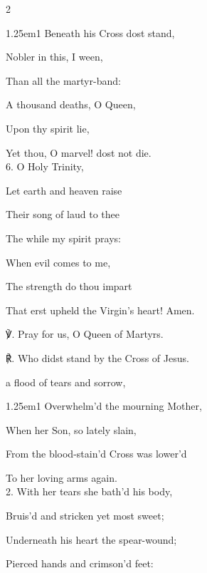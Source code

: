 \begin{paracol}{2}
\begin{hangparas}{1.25em}{1}
Beneath his Cross dost stand,

Nobler in this, I ween,

Than all the martyr-band:

A thousand deaths, O Queen,

Upon thy spirit lie,

Yet thou, O marvel! dost not die.\\

6. O Holy Trinity,

Let earth and heaven raise

Their song of laud to thee

The while my spirit prays:

When evil comes to me,

The strength do thou impart

That erst upheld the Virgin’s heart! Amen.\\
\end{hangparas}

℣. Pray for us, O Queen of Martyrs.

℟. Who didst stand by the Cross of Jesus.



\switchcolumn

\mattins
{}

\vspace{1\baselineskip}

\mattinsInvitatoryHymn
{} a flood of tears and sorrow,


\begin{hangparas}{1.25em}{1}
Overwhelm'd the mourning Mother,

When her Son, so lately slain,

From the blood-stain'd Cross was lower'd

To her loving arms again.\\

2. With her tears she bath'd his body,

Bruis'd and stricken yet most sweet;

Underneath his heart the spear-wound;

Pierced hands and crimson'd feet:


\end{hangparas}
\end{paracol}
